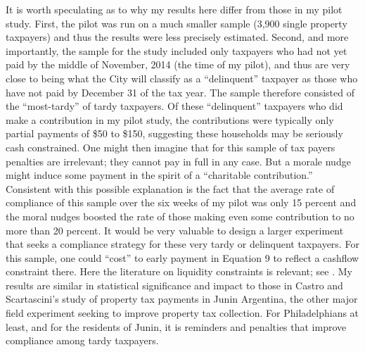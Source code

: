 It is worth speculating as to why my results here differ from those
in my pilot study.  First, the pilot was run on a much smaller sample
(3,900 single property taxpayers) and thus the results were less
precisely estimated.  Second, and more importantly, the sample for the
study included only taxpayers who had not yet paid by the middle of
November, 2014 (the time of my pilot), and thus are very close to
being what the City will classify as a ``delinquent'' taxpayer as those
who have not paid by December 31 of the tax year.  The sample
therefore consisted of the ``most-tardy'' of tardy taxpayers.  Of
these ``delinquent'' taxpayers who did make a contribution in my pilot study, the contributions were typically only partial payments of
\$50 to \$150, suggesting these households may be seriously cash
constrained.  One might then imagine that for this sample of tax
payers penalties are irrelevant; they cannot pay in full in any case.
But a morale nudge might induce some payment in the spirit of a
``charitable contribution.''  Consistent with this possible explanation
is the fact that the average rate of compliance of this sample over
the six weeks of my pilot was only 15 percent and the moral nudges
boosted the rate of those making even some contribution to no more
than 20 percent.  It would be very valuable to design a larger
experiment that seeks a compliance strategy for these very tardy or
delinquent taxpayers. For this sample, one could ``cost'' to early payment in Equation 9 to reflect a cashflow constraint there. Here the literature on liquidity constraints is relevant; see \cite{zeldes1989consumption}. My results are similar in statistical
significance and impact to those in Castro and Scartascini's
\citeyearpar{castro} study of property tax payments in Junin Argentina,
the other major field experiment seeking to improve property tax
collection.  For Philadelphians at least, and for the residents of
Junin, it is reminders and penalties that improve compliance among
tardy taxpayers.

